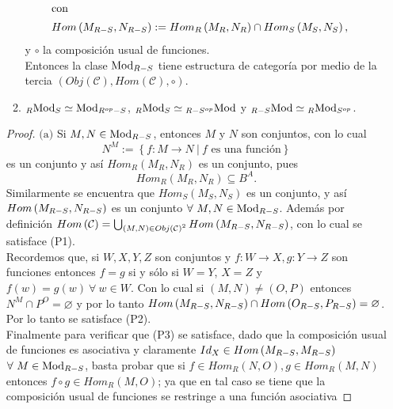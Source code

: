 \documentclass{article}
\newcommand{\lrprth}[1]{
	\left(#1\right)
}
\newcommand{\lrbrack}[1]{
	\left\{#1\right\}
}
\newcommand{\opst}[1]{
	{#1}^{op}
}
\newcommand{\ringmod}[3]{
	\if#3l
	{}_{#1}#2
	\else
	\if#3r
	#2_{#1}
	\fi
	\fi
}
\newcommand{\ringbimod}[4]{
	\if#4l
	{}_{#1-#2}#3
	\else
	\if#4r
	#3_{#1-#2}
	\else 
	\ifstrequal{#4}{lr}{
		{}_{#1}#3_{#2}
	}
	\fi
	\fi
}
\newcommand{\ringmodhom}[3]{
	Hom_{#1}\lrprth{#2,#3}
}
\theoremstyle{definition}
\theoremstyle{plain}
\theoremstyle{plain}
\theoremstyle{definition}
\theoremstyle{definition}
\theoremstyle{definition}
\theoremstyle{definition}
\theoremstyle{definition}
\theoremstyle{definition}
\begin{document}
\begin{enumerate}[label=\textbf{Ej \arabic*.}]
\begin{enumerate}[label=(\alph*)]
\begin{align*}
		\intertext{con}
		Hom\lrprth{\ringbimod{R}{S}{M}{r},\ringbimod{R}{S}{N}{r}}&:=Hom_R\lrprth{\ringmod{R}{M}{r},\ringmod{R}{N}{r}}\cap Hom_S\lrprth{\ringmod{S}{M}{r},\ringmod{S}{N}{r}},
	\end{align*}
	y $\circ$ la composición usual de funciones.\\ Entonces la clase $\ringbimod{R}{S}{\text{Mod}}{r}$ tiene estructura de categoría por medio de la tercia $\lrprth{Obj\lrprth{\mathcal{C}},Hom\lrprth{\mathcal{C}},\circ}$.
	\item $\ringbimod{R}{S}{\text{Mod}}{lr}\simeq\ringbimod{\opst{R}}{S}{\text{Mod}}{r}$, $\ringbimod{R}{S}{\text{Mod}}{lr}\simeq\ringbimod{R}{\opst{S}}{\text{Mod}}{l}$ y $\ringbimod{R}{S}{\text{Mod}}{l}\simeq\ringbimod{R}{\opst{S}}{\text{Mod}}{lr}$.
\end{enumerate}
\begin{proof}
	$\boxed{\text{(a)}}$ Si $M,N\in\ringbimod{R}{S}{\text{Mod}}{r}$, entonces $M$ y $N$ son conjuntos, con lo cual 
	\begin{equation*}
		N^M:=\lrbrack{f:M\rightarrow N\ |\ f\text{ es una función}}
	\end{equation*} 
    es un conjunto y así $\ringmodhom{R}{M_R}{N_R}$ es un conjunto, pues $$\ringmodhom{R}{M_R}{N_R}\subseteq B^A.$$
     Similarmente se encuentra que $\ringmodhom{S}{M_S}{N_S}$ es un conjunto, y así $Hom\lrprth{\ringbimod{R}{S}{M}{r},\ringbimod{R}{S}{N}{r}}$ es un conjunto $\forall\ M, N\in\ringbimod{R}{S}{\text{Mod}}{r}$. Además por definición $Hom\lrprth{\mathcal{C}}=\bigcup_{\lrprth{M,N}\in Obj\lrprth{\mathcal{C}}^2}Hom\lrprth{\ringbimod{R}{S}{M}{r},\ringbimod{R}{S}{N}{r}}$, con lo cual se satisface (P1).\\
Recordemos que, si $W,X,Y,Z$ son conjuntos y $f:W\rightarrow X, g:Y\rightarrow Z$ son funciones entonces $f=g$ si y sólo si $W=Y$, $X=Z$ y $f(w)=g(w)\ \forall\ w\in W$. Con lo cual si $(M,N)\neq\lrprth{O,P}$ entonces $N^M\cap P^O=\varnothing$ y por lo tanto $Hom\lrprth{\ringbimod{R}{S}{M}{r},\ringbimod{R}{S}{N}{r}}\cap Hom\lrprth{\ringbimod{R}{S}{O}{r},\ringbimod{R}{S}{P}{r}}=\varnothing$. Por lo tanto se satisface (P2).\\
Finalmente para verificar que (P3) se satisface, dado que la composición usual de funciones es asociativa y claramente $Id_X\in Hom\lrprth{\ringbimod{R}{S}{M}{r},\ringbimod{R}{S}{
		M}{r}}$ $\forall\ M\in\ringbimod{R}{S}{\text{Mod}}{r}$, basta probar que si $f\in\ringmodhom{R}{N}{O}, g\in\ringmodhom{R}{M}{N}$ entonces $f\circ g\in\ringmodhom{R}{M}{O}$; ya que en tal caso se tiene que la composición usual de funciones se restringe a una función asociativa

\end{proof}
\end{enumerate}
\end{document}
